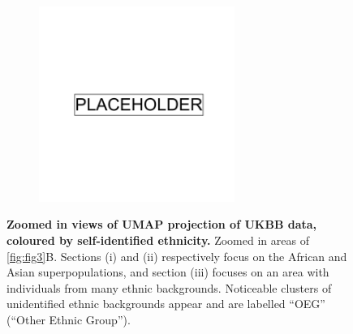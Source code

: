 \newpage

\begin{figure}[ht]
    \centering
    \begin{subfigure}{0.8\textwidth}
    \includegraphics[width=0.7\textwidth]{placeholder.png}
    \end{subfigure}
    \caption[Zoomed in views of UMAP projection of UKBB data, coloured by self-identified ethnicity]{\textbf{Zoomed in views of UMAP projection of UKBB data, coloured by self-identified ethnicity.} Zoomed in areas of \ref{fig:fig3}B. Sections (i) and (ii) respectively focus on the African and Asian superpopulations, and section (iii) focuses on an area with individuals from many ethnic backgrounds. Noticeable clusters of unidentified ethnic backgrounds appear and are labelled ``OEG'' (``Other Ethnic Group'').}
    \label{fig:supp_ukbb_zoom}
\end{figure}

\newpage

